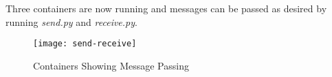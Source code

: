 Three containers are now running and messages can be passed as desired by running \textit{send.py} and \textit{receive.py}.

\begin{figure}[H]
	\setlength{\belowcaptionskip}{15pt plus 3pt minus 2pt}
	\caption{Containers Showing Message Passing}
	\centering
	\texttt{[image: send-receive]}
	\label{fig:rabbit}
\end{figure}